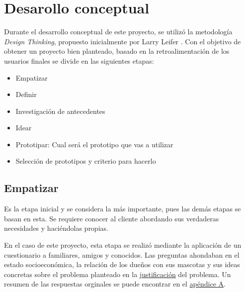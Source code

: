 \documentclass[12pt,a4paper]{proyectoinnovacion}
\begin{document}




\section{Desarollo conceptual}

Durante el desarrollo conceptual de este proyecto, se utilizó la metodología \textit{Design Thinking}, propuesto inicialmente por Larry Leifer \textcite{plattner2011}. Con el objetivo de obtener un proyecto bien planteado, basado en la retroalimentación de los usuarios finales se divide en las siguientes etapas:


\begin{itemize}
  \item Empatizar
  \item Definir
  \item Investigación de antecedentes
  \item Idear
  \item Prototipar: Cual será el prototipo que vas a utilizar
  \item Selección de prototipos y criterio para hacerlo  
\end{itemize}


\subsection{Empatizar}

Es la etapa inicial y se considera la más importante, pues las demás etapas se basan en esta. Se requiere conocer al cliente abordando sus verdaderas necesidades y haciéndolas propias. 

En el caso de este proyecto, esta etapa se realizó mediante la aplicación de un cuestionario a familiares, amigos y conocidos. Las preguntas ahondaban en el estado socioeconómica, la relación de los dueños con sus mascotas y sus ideas concretas sobre el problema planteado en la \hyperref[sec:justificacion]{justificación} del problema. Un resumen de las respuestas orginales se puede encontrar en el \hyperref[ape:tablaencuesta]{apéndice A}.
\end{document}

